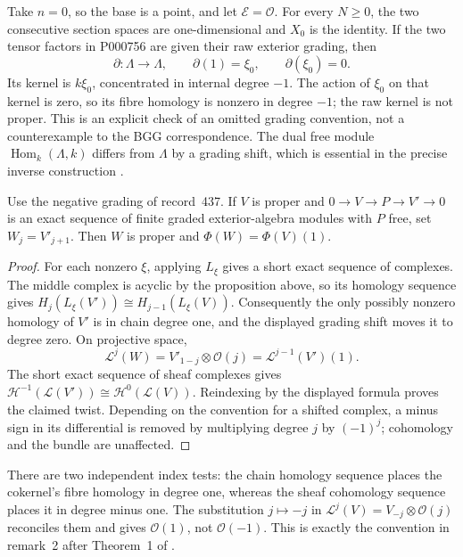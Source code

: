\begin{example}\ours{}
Take \(n=0\), so the base is a point, and let
\(\mathcal E=\mathcal O\). For every \(N\geq0\), the two consecutive
section spaces are one-dimensional and \(X_0\) is the identity. If the
two tensor factors in P000756 are given their raw exterior grading, then
\[
 \partial:\Lambda\longrightarrow\Lambda,\qquad
 \partial(1)=\xi_0,\qquad \partial(\xi_0)=0.
\]
Its kernel is \(k\xi_0\), concentrated in internal degree \(-1\).
The action of \(\xi_0\) on that kernel is zero, so its fibre homology
is nonzero in degree \(-1\); the raw kernel is not proper. This is an
explicit check of an omitted grading convention, not a counterexample to
the BGG correspondence. The dual free module
\(\operatorname{Hom}_k(\Lambda,k)\) differs from \(\Lambda\) by a
grading shift, which is essential in the precise inverse construction
\citep[\S4]{bernsteingelfandgelfand1978bundles}.
\end{example}

\begin{proposition}\ours{}
Use the negative grading of record~437. If \(V\) is proper and
\(0\to V\to P\to V'\to0\) is an exact sequence of finite graded
exterior-algebra modules with \(P\) free, set \(W_j=V'_{j+1}\).
Then \(W\) is proper and \(\Phi(W)=\Phi(V)(1)\).
\end{proposition}
\begin{proof}
For each nonzero \(\xi\), applying \(L_\xi\) gives a short exact
sequence of complexes. The middle complex is acyclic by the proposition
above, so its homology sequence gives
\(H_j(L_\xi(V'))\cong H_{j-1}(L_\xi(V))\). Consequently the only
possibly nonzero homology of \(V'\) is in chain degree one, and the
displayed grading shift moves it to degree zero. On projective space,
\[
 \mathcal L^j(W)
 =V'_{1-j}\otimes\mathcal O(j)
 =\mathcal L^{j-1}(V')(1).
\]
The short exact sequence of sheaf complexes gives
\(\mathcal H^{-1}(\mathcal L(V'))\cong\mathcal H^0(\mathcal L(V))\).
Reindexing by the displayed formula proves the claimed twist. Depending
on the convention for a shifted complex, a minus sign in its differential
is removed by multiplying degree \(j\) by \((-1)^j\); cohomology and
the bundle are unaffected.
\end{proof}

\begin{remark}
There are two independent index tests: the chain homology sequence
places the cokernel's fibre homology in degree one, whereas the sheaf
cohomology sequence places it in degree minus one. The substitution
\(j\mapsto-j\) in \(\mathcal L^j(V)=V_{-j}\otimes\mathcal O(j)\)
reconciles them and gives \(\mathcal O(1)\), not \(\mathcal O(-1)\).
This is exactly the convention in remark~2 after Theorem~1 of
\citet{bernsteingelfandgelfand1978bundles}.
\end{remark}


